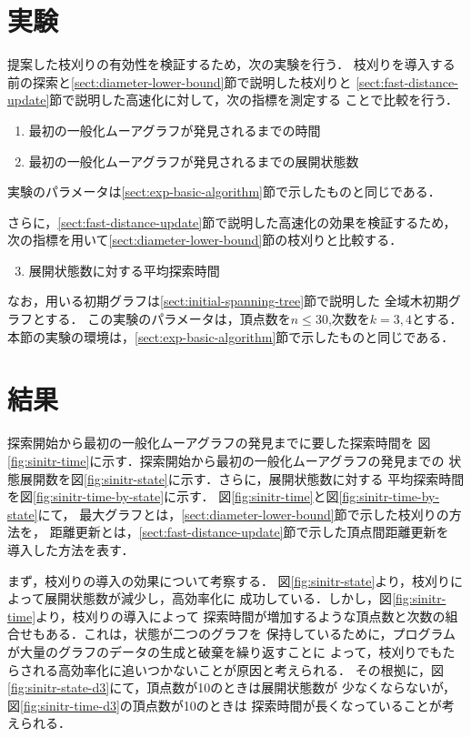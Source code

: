 \section{実験}
\label{sect:exp-reduce-by-prune}
提案した枝刈りの有効性を検証するため，次の実験を行う．
枝刈りを導入する前の探索と\ref{sect:diameter-lower-bound}節で説明した枝刈りと
\ref{sect:fast-distance-update}節で説明した高速化に対して，次の指標を測定する
ことで比較を行う．
\begin{enumerate}
\item 最初の一般化ムーアグラフが発見されるまでの時間
\item 最初の一般化ムーアグラフが発見されるまでの展開状態数
\end{enumerate}
実験のパラメータは\ref{sect:exp-basic-algorithm}節で示したものと同じである．

さらに，\ref{sect:fast-distance-update}節で説明した高速化の効果を検証するため，
次の指標を用いて\ref{sect:diameter-lower-bound}節の枝刈りと比較する．
\begin{enumerate}\setcounter{enumi}{2}
\item 展開状態数に対する平均探索時間
\end{enumerate}
なお，用いる初期グラフは\ref{sect:initial-spanning-tree}節で説明した
全域木初期グラフとする．
この実験のパラメータは，頂点数を$n\leq30$,次数を$k=3,4$とする．
本節の実験の環境は，\ref{sect:exp-basic-algorithm}節で示したものと同じである．

\section{結果}
探索開始から最初の一般化ムーアグラフの発見までに要した探索時間を
図\ref{fig:sinitr-time}に示す．探索開始から最初の一般化ムーアグラフの発見までの
状態展開数を図\ref{fig:sinitr-state}に示す．さらに，展開状態数に対する
平均探索時間を図\ref{fig:sinitr-time-by-state}に示す．
図\ref{fig:sinitr-time}と図\ref{fig:sinitr-time-by-state}にて，
最大グラフとは，\ref{sect:diameter-lower-bound}節で示した枝刈りの方法を，
距離更新とは，\ref{sect:fast-distance-update}節で示した頂点間距離更新を
導入した方法を表す．

まず，枝刈りの導入の効果について考察する．
図\ref{fig:sinitr-state}より，枝刈りによって展開状態数が減少し，高効率化に
成功している．しかし，図\ref{fig:sinitr-time}より，枝刈りの導入によって
探索時間が増加するような頂点数と次数の組合せもある．これは，状態が二つのグラフを
保持しているために，プログラムが大量のグラフのデータの生成と破棄を繰り返すことに
よって，枝刈りでもたらされる高効率化に追いつかないことが原因と考えられる．
その根拠に，図\ref{fig:sinitr-state-d3}にて，頂点数が10のときは展開状態数が
少なくならないが，図\ref{fig:sinitr-time-d3}の頂点数が10のときは
探索時間が長くなっていることが考えられる．

